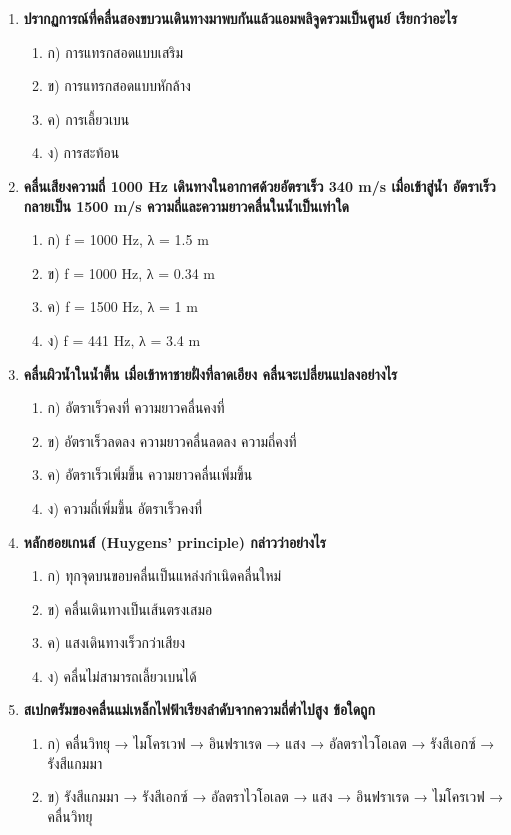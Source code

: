 \documentclass[12pt]{article}
\begin{document}
\begin{enumerate}
\item \textbf{ปรากฏการณ์ที่คลื่นสองขบวนเดินทางมาพบกันแล้วแอมพลิจูดรวมเป็นศูนย์ เรียกว่าอะไร}
\begin{enumerate}
\item ก) การแทรกสอดแบบเสริม
\item ข) การแทรกสอดแบบหักล้าง
\item ค) การเลี้ยวเบน
\item ง) การสะท้อน
\end{enumerate}
\item \textbf{คลื่นเสียงความถี่ 1000 Hz เดินทางในอากาศด้วยอัตราเร็ว 340 m/s เมื่อเข้าสู่น้ำ อัตราเร็วกลายเป็น 1500 m/s ความถี่และความยาวคลื่นในน้ำเป็นเท่าใด}
\begin{enumerate}
\item ก) f = 1000 Hz, λ = 1.5 m
\item ข) f = 1000 Hz, λ = 0.34 m
\item ค) f = 1500 Hz, λ = 1 m
\item ง) f = 441 Hz, λ = 3.4 m
\end{enumerate}
\item \textbf{คลื่นผิวน้ำในน้ำตื้น เมื่อเข้าหาชายฝั่งที่ลาดเอียง คลื่นจะเปลี่ยนแปลงอย่างไร}
\begin{enumerate}
\item ก) อัตราเร็วคงที่ ความยาวคลื่นคงที่
\item ข) อัตราเร็วลดลง ความยาวคลื่นลดลง ความถี่คงที่
\item ค) อัตราเร็วเพิ่มขึ้น ความยาวคลื่นเพิ่มขึ้น
\item ง) ความถี่เพิ่มขึ้น อัตราเร็วคงที่
\end{enumerate}
\item \textbf{หลักฮอยเกนส์ (Huygens' principle) กล่าวว่าอย่างไร}
\begin{enumerate}
\item ก) ทุกจุดบนขอบคลื่นเป็นแหล่งกำเนิดคลื่นใหม่
\item ข) คลื่นเดินทางเป็นเส้นตรงเสมอ
\item ค) แสงเดินทางเร็วกว่าเสียง
\item ง) คลื่นไม่สามารถเลี้ยวเบนได้
\end{enumerate}
\item \textbf{สเปกตรัมของคลื่นแม่เหล็กไฟฟ้าเรียงลำดับจากความถี่ต่ำไปสูง ข้อใดถูก}
\begin{enumerate}
\item ก) คลื่นวิทยุ → ไมโครเวฟ → อินฟราเรด → แสง → อัลตราไวโอเลต → รังสีเอกซ์ → รังสีแกมมา
\item ข) รังสีแกมมา → รังสีเอกซ์ → อัลตราไวโอเลต → แสง → อินฟราเรด → ไมโครเวฟ → คลื่นวิทยุ

\end{enumerate}
\end{enumerate}
\end{document}
